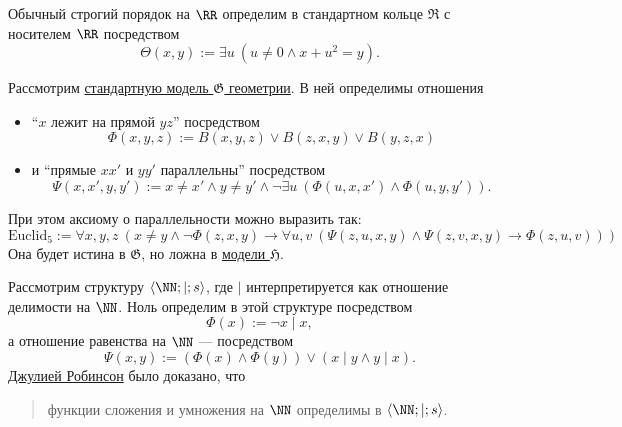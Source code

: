 \documentclass[12pt,a4paper]{article}
\begin{document}
    \begin{example}
        Обычный строгий порядок на $\RR$ определим в стандартном кольце $\mathfrak{R}$ с носителем $\RR$ посредством
        \[\Theta(x, y) := \exists u\ (u \neq 0 \wedge x + u^2 = y).\]
    \end{example}

    \begin{example}
        Рассмотрим \hyperlink{G-structure-definition}{стандартную модель $\mathfrak{G}$ геометрии}. В ней определимы отношения
        \begin{itemize}
            \item ``$x$ лежит на прямой $yz$'' посредством
                \[\Phi(x, y, z) := B(x, y, z) \vee B(z, x, y) \vee B(y, z, x)\]
            \item и ``прямые $xx'$ и $yy'$ параллельны'' посредством
                \[\Psi(x, x', y, y') := x \neq x' \wedge y \neq y' \wedge \neg \exists u\ (\Phi(u, x, x') \wedge \Phi(u, y, y')).\]
        \end{itemize}
        \hypertarget{Euclid_5-axiom-definition}{}При этом аксиому о параллельности можно выразить так:
        \[
            \mathrm{Euclid}_5 := \forall x, y, z\ (x \neq y \wedge \neg \Phi(z, x, y) \rightarrow \forall u, v\ (\Psi(z, u, x, y) \wedge \Psi(z, v, x, y) \rightarrow \Phi(z, u, v)))
        \]
        Она будет истина в $\mathfrak{G}$, но ложна в \hyperlink{H-structure-definition}{модели $\mathfrak{H}$}.
    \end{example}

    \begin{example}
        Рассмотрим структуру $\langle \NN; \mid; s \rangle$, где $\mid$ интерпретируется как отношение делимости на $\NN$. Ноль определим в этой структуре посредством
        \[\Phi(x) := \neg x \mid x,\]
        а отношение равенства на $\NN$ --- посредством
        \[\Psi(x, y) := (\Phi(x) \wedge \Phi(y)) \vee (x \mid y \wedge y \mid x).\]
        \href{https://en.wikipedia.org/wiki/Julia_Robinson}{Джулией Робинсон} было доказано, что
        \begin{quotation}
            функции сложения и умножения на $\NN$ определимы в $\langle \NN; \mid; s \rangle$.
        \end{quotation}
    \end{example}
\end{document}
